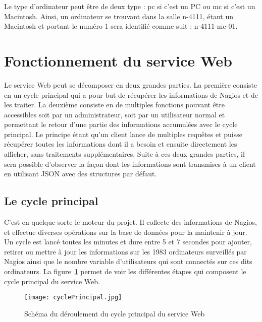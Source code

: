 Le type d'ordinateur peut \^etre de deux type : \textsf{pc} si c'est un PC ou \textsf{mc} si c'est un Macintosh.
Ainsi, un ordinateur se trouvant dans la salle \textsf{n-4111}, \'etant un Macintosh et portant le num\'ero 1 sera identifi\'e comme suit : \textsf{n-4111-mc-01}.

\section{Fonctionnement du service Web}

Le service Web peut se d\'ecomposer en deux grandes parties.
La premi\`ere consiste en un cycle principal qui a pour but de r\'ecup\'erer les informations de Nagios et de les traiter.
La deuxi\`eme consiste en de multiples fonctions pouvant \^etre accessibles soit par un administrateur, soit par un utilisateur normal et permettant le retour d'une partie des informations accumul\'ees avec le cycle principal.
Le principe \'etant qu'un client lance de multiples requ\^etes et puisse r\'ecup\'erer toutes les informations dont il a besoin et ensuite directement les afficher, sans traitements suppl\'ementaires.
Suite \`a ces deux grandes parties, il sera possible d'observer la fa\c{c}on dont les informations sont transmises \`a un client en utilisant JSON avec des structures par d\'efaut.

\subsection{Le cycle principal}
\label{section:cyclePrincipal}

C'est en quelque sorte le moteur du projet.
Il collecte des informations de Nagios, et effectue diverses op\'erations sur la base de donn\'ees pour la maintenir \`a jour.
Un cycle est lanc\'e toutes les minutes et dure entre 5 et 7 secondes pour ajouter, retirer ou mettre \`a jour les informations sur les 1983 ordinateurs surveill\'es par Nagios ainsi que le nombre variable d'utilisateurs qui sont connect\'es sur ces dits ordinateurs.
La figure~\ref{figure:cyclePrincipal} permet de voir les diff\'erentes \'etapes qui composent le cycle principal du service Web.

\begin{figure}[!ht]
	\centering
	\texttt{[image: cyclePrincipal.jpg]}
	\caption{Sch\'ema du d\'eroulement du cycle principal du service Web}
	\label{figure:cyclePrincipal}
	
\end{figure}

